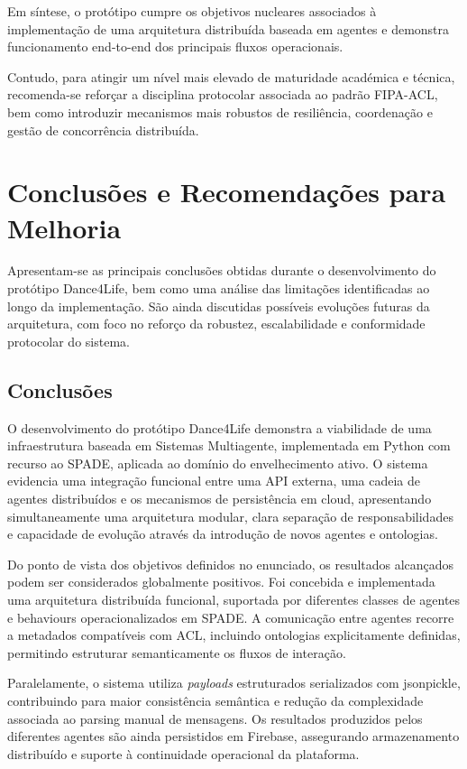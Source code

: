 \documentclass[runningheads]{llncs}
\begin{document}
Em síntese, o protótipo cumpre os objetivos nucleares associados à implementação de uma arquitetura distribuída baseada em agentes e demonstra funcionamento end-to-end dos principais fluxos operacionais.  

Contudo, para atingir um nível mais elevado de maturidade académica e técnica, recomenda-se reforçar a disciplina protocolar associada ao padrão FIPA-ACL, bem como introduzir mecanismos mais robustos de resiliência, coordenação e gestão de concorrência distribuída. 

\section{Conclusões e Recomendações para Melhoria}
Apresentam-se as principais conclusões obtidas durante o desenvolvimento do protótipo Dance4Life, bem como uma análise das limitações identificadas ao longo da implementação. São ainda discutidas possíveis evoluções futuras da arquitetura, com foco no reforço da robustez, escalabilidade e conformidade protocolar do sistema. 

\subsection{Conclusões}
O desenvolvimento do protótipo Dance4Life demonstra a viabilidade de uma infraestrutura baseada em Sistemas Multiagente, implementada em Python com recurso ao SPADE, aplicada ao domínio do envelhecimento ativo. O sistema evidencia uma integração funcional entre uma API externa, uma cadeia de agentes distribuídos e os mecanismos de persistência em cloud, apresentando simultaneamente uma arquitetura modular, clara separação de responsabilidades e capacidade de evolução através da introdução de novos agentes e ontologias. 

Do ponto de vista dos objetivos definidos no enunciado, os resultados alcançados podem ser considerados globalmente positivos. Foi concebida e implementada uma arquitetura distribuída funcional, suportada por diferentes classes de agentes e behaviours operacionalizados em SPADE. A comunicação entre agentes recorre a metadados compatíveis com ACL, incluindo ontologias explicitamente definidas, permitindo estruturar semanticamente os fluxos de interação.  

Paralelamente, o sistema utiliza \textit{payloads} estruturados serializados com jsonpickle, contribuindo para maior consistência semântica e redução da complexidade associada ao parsing manual de mensagens. Os resultados produzidos pelos diferentes agentes são ainda persistidos em Firebase, assegurando armazenamento distribuído e suporte à continuidade operacional da plataforma. 
\end{document}
